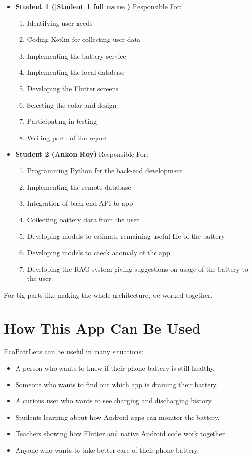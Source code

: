 \documentclass[12pt,a4paper]{report}
\begin{document}
\begin{itemize}
    \item \textbf{Student 1 ([Student 1 full name])} Responsible For:
    \begin{enumerate}
    \item Identifying user needs
    \item Coding Kotlin for collecting user data
    \item Implementing the battery service
    \item Implementing the local database
    \item Developing the Flutter screens
    \item Selecting the color and design
    \item Participating in testing
    \item Writing parts of the report
    \end{enumerate}
        
    \item \textbf{Student 2 (Ankon Roy)} Responsible For:
    \begin{enumerate}
    \item Programming Python for the back-end development
    \item Implementing the remote database
    \item Integration of back-end API to app
    \item Collecting battery data from the user
    \item Developing models to estimate remaining useful life of the battery
    \item Developing models to check anomaly of the app
    \item Developing the RAG system giving suggestions on usage of the battery to the user
    \end{enumerate}
    \end{itemize}
For big parts like making the whole architecture, we worked together.

\section{How This App Can Be Used}
EcoBattLens can be useful in many situations:

\begin{itemize}
    \item A person who wants to know if their phone battery is still healthy.
    \item Someone who wants to find out which app is draining their battery.
    \item A curious user who wants to see charging and discharging history.
    \item Students learning about how Android apps can monitor the battery.
    \item Teachers showing how Flutter and native Android code work together.
    \item Anyone who wants to take better care of their phone battery.
\end{itemize}
\end{document}
